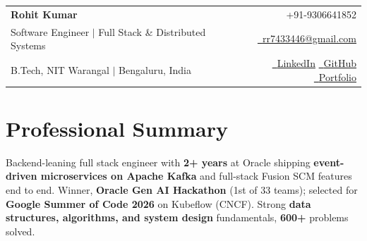 \documentclass[a4paper,10pt]{article}
\makeatletter
\newcommand{\phone}{9306641852}
\newcommand{\emaila}{rr7433446@gmail.com}
\makeatother
\begin{document}
\selectfont

{
\begin{tabularx}{\linewidth}{L r} \\
  \textbf{\Large Rohit Kumar} & {\raisebox{0.0\height}{\footnotesize \faPhone}\ +91-\phone}\\
  {Software Engineer $\vert$ Full Stack \& Distributed Systems} & \href{mailto:\emaila}{\raisebox{0.0\height}{\footnotesize \faEnvelope}\ {\emaila}} \\
  {B.Tech, NIT Warangal $\vert$ Bengaluru, India} & \href{https://www.linkedin.com/in/rr7433446/}{\raisebox{0.0\height}{\footnotesize \faLinkedin}\ {LinkedIn}}\enspace
  \href{https://github.com/kmr-rohit}{\raisebox{0.0\height}{\footnotesize \faGithub}\ {GitHub}}\enspace
  \href{https://kmrrohit.space/}{\raisebox{0.0\height}{\footnotesize \faGlobe}\ {Portfolio}}
\end{tabularx}
}

\section{\textbf{Professional Summary}}
\begin{itemize}[leftmargin=0.05in, label={}]
  \small{\item{
    Backend-leaning full stack engineer with \textbf{2+ years} at Oracle shipping \textbf{event-driven microservices on Apache Kafka} and full-stack Fusion SCM features end to end. Winner, \textbf{Oracle Gen AI Hackathon} (1st of 33 teams); selected for \textbf{Google Summer of Code 2026} on Kubeflow (CNCF). Strong \textbf{data structures, algorithms, and system design} fundamentals, \textbf{600+} problems solved.
  }}
\end{itemize}
\vspace{-8pt}

\end{document}
